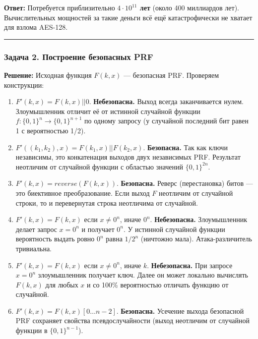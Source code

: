 ﻿\documentclass[9pt,a4paper]{extarticle}
\newcommand{\tightlist}{}
\begin{document}
\textbf{Ответ:} Потребуется приблизительно \textbf{\(4 \cdot 10^{11}\) лет} (около 400 миллиардов лет). Вычислительных мощностей за такие деньги всё ещё катастрофически не хватает для взлома AES-128.

\begin{center}\rule{0.5\linewidth}{0.5pt}\end{center}

\subsubsection{Задача 2. Построение безопасных PRF}\label{ux437ux430ux434ux430ux447ux430-2.-ux43fux43eux441ux442ux440ux43eux435ux43dux438ux435-ux431ux435ux437ux43eux43fux430ux441ux43dux44bux445-prf}

\textbf{Решение:} Исходная функция \(F(k, x)\) --- безопасная PRF. Проверяем конструкции:

\begin{enumerate}
\def\labelenumi{\arabic{enumi}.}
\tightlist
\item
  \(F'(k, x) = F(k, x) || 0\). \textbf{Небезопасна.} Выход всегда заканчивается нулем. Злоумышленник отличит её от истинной случайной функции \(f: \{0,1\}^n \to \{0,1\}^{n+1}\) по одному запросу (у случайной последний бит равен 1 с вероятностью 1/2).
\item
  \(F'((k_1, k_2), x) = F(k_1, x) || F(k_2, x)\). \textbf{Безопасна.} Так как ключи независимы, это конкатенация выходов двух независимых PRF. Результат неотличим от случайной функции с областью значений \(\{0,1\}^{2n}\).
\item
  \(F'(k, x) = reverse(F(k, x))\). \textbf{Безопасна.} Реверс (перестановка) битов --- это биективное преобразование. Если выход \(F\) неотличим от случайной строки, то и перевернутая строка неотличима от случайной.
\item
  \(F'(k, x) = F(k, x)\) если \(x \neq 0^n\), иначе \(0^n\). \textbf{Небезопасна.} Злоумышленник делает запрос \(x = 0^n\) и получает \(0^n\). У истинной случайной функции вероятность выдать ровно \(0^n\) равна \(1/2^n\) (ничтожно мала). Атака-различитель тривиальна.
\item
  \(F'(k, x) = F(k, x)\) если \(x \neq 0^n\), иначе \(k\). \textbf{Небезопасна.} При запросе \(x = 0^n\) злоумышленник получает ключ. Далее он может локально вычислять \(F(k, x)\) для любых \(x\) и со 100\% вероятностью отличать функцию от случайной.
\item
  \(F'(k, x) = F(k, x)[0 \dots n-2]\). \textbf{Безопасна.} Усечение выхода безопасной PRF сохраняет свойства псевдослучайности (выход неотличим от случайной функции в \(\{0,1\}^{n-1}\)).
\end{enumerate}
\end{document}
